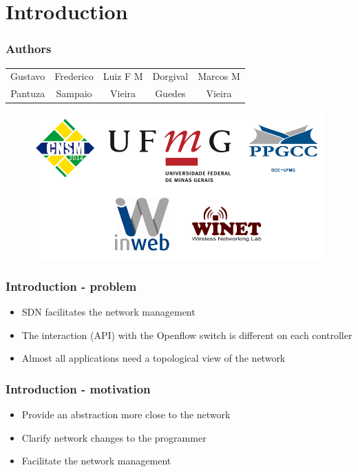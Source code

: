 %
%
\section{Introduction}


%
%
\begin{frame}\frametitle{Authors}

    \begin{table}[h]
    {\setlength{\tabcolsep}{1em}
    \begin{tabular}{ccccc}
            \hline
             Gustavo & Frederico & Luiz F M & Dorgival & Marcos M \\
             Pantuza & Sampaio & Vieira & Guedes & Vieira 
    \end{tabular}}
    \end{table}

	\begin{figure}[h]
        \centering
        \includegraphics[width=\linewidth]{img/cnsm-footer.png}
    \end{figure}
\end{frame}


%
%
\begin{frame}\frametitle{Introduction - problem}

    \begin{itemize}
        \item SDN facilitates the network management 
        \item The interaction (API) with the Openflow switch is different on each
              controller
        \item Almost all applications need a topological view of the network
    \end{itemize}

\end{frame}


%
%
\begin{frame}\frametitle{Introduction - motivation}

    \begin{itemize}
        \item Provide an abstraction more close to the network
        \item Clarify network changes to the programmer
        \item Facilitate the network management
    \end{itemize}

\end{frame}


